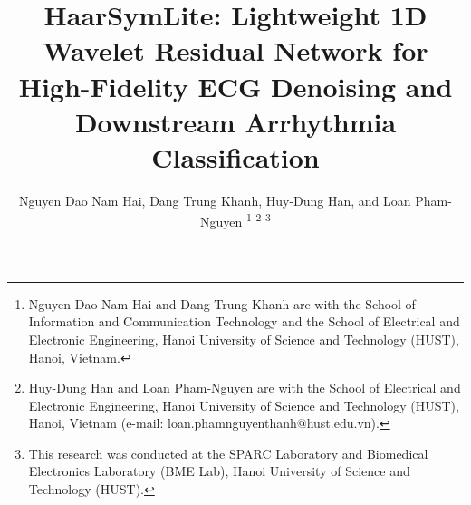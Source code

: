 \documentclass[journal]{IEEEtran}
\begin{document}
\title{HaarSymLite: Lightweight 1D Wavelet Residual Network for High-Fidelity ECG Denoising and Downstream Arrhythmia Classification}

\author{Nguyen Dao Nam Hai, Dang Trung Khanh, Huy-Dung Han, and Loan Pham-Nguyen%
\thanks{Nguyen Dao Nam Hai and Dang Trung Khanh are with the School of Information and Communication Technology and the School of Electrical and Electronic Engineering, Hanoi University of Science and Technology (HUST), Hanoi, Vietnam.}%
\thanks{Huy-Dung Han and Loan Pham-Nguyen are with the School of Electrical and Electronic Engineering, Hanoi University of Science and Technology (HUST), Hanoi, Vietnam (e-mail: loan.phamnguyenthanh@hust.edu.vn).}%
\thanks{This research was conducted at the SPARC Laboratory and Biomedical Electronics Laboratory (BME Lab), Hanoi University of Science and Technology (HUST).}%
}


\maketitle












\end{document}
